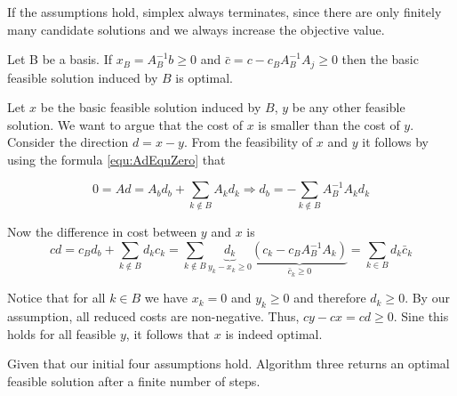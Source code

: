 If the assumptions hold, simplex always terminates, since there are only finitely many candidate solutions and we always increase the objective value.

\begin{thm}\label{Pr:simplexIIIopt} Let B be a basis. If $x_B=A^{-1}_Bb\geq 0$ and $\bar c=c- c_B A_B^{-1}A_j \geq 0$ then the basic feasible solution induced by $B$ is optimal.\end{thm}

\begin{pr} Let $x$ be the basic feasible solution induced by $B$, $y$ be any other feasible solution. We want to argue that the cost of $x$ is smaller than the cost of $y$. %
Consider the direction $d=x-y$. From the feasibility of $x$ and $y$ it follows by using the formula \ref{equ:AdEquZero} that

\[0=Ad=A_b d_b + \sum_{k \not \in B } {A_k d_k} \Rightarrow d_b = - \sum_{k \not \in B}{A_{B}^{-1}A_k d_k}\]

Now the difference in cost between $y$ and $x$ is 
\[cd=c_{B} d_b + \sum_{k \not \in B} {d_k c_k}= \sum_{k \not \in B} {\underbrace{d_k}_{y_k-x_k\geq 0} \underbrace{(c_k-c_BA_{B}^{-1} A_k)}_{\bar c_k\geq 0}}=\sum_{k \in B} {d_k \bar c_k}\]

Notice that for all $k \in B$ we have $x_k=0$ and $y_k \geq 0$ and therefore $d_k \geq 0$. By our assumption, all reduced costs are non-negative. Thus, $c y - c x = c d \geq 0$. Sine this holds for all feasible $y$, it follows that $x$ is indeed optimal.
\end{pr}

\begin{cor}
Given that our initial four assumptions hold. Algorithm three returns an optimal feasible solution after a finite number of steps.
\end{cor}